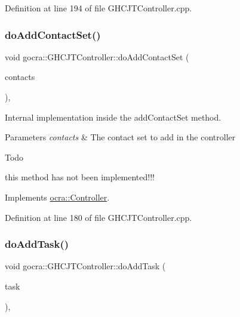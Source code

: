Definition at line 194 of file G\+H\+C\+J\+T\+Controller.\+cpp.

\hypertarget{classgocra_1_1GHCJTController_a28367b3b895eaa223581131258ef5d2d}{}\label{classgocra_1_1GHCJTController_a28367b3b895eaa223581131258ef5d2d} 
\subsubsection{\texorpdfstring{do\+Add\+Contact\+Set()}{doAddContactSet()}}
{\footnotesize\ttfamily void gocra\+::\+G\+H\+C\+J\+T\+Controller\+::do\+Add\+Contact\+Set (\begin{DoxyParamCaption}\item[{const \hyperlink{classocra_1_1ContactSet}{Contact\+Set} \&}]{contacts }\end{DoxyParamCaption})\hspace{0.3cm}{\ttfamily [protected]}, {\ttfamily [virtual]}}

Internal implementation inside the add\+Contact\+Set method.


\begin{DoxyParams}{Parameters}
{\em contacts} & The contact set to add in the controller \\
\hline
\end{DoxyParams}
\begin{DoxyRefDesc}{Todo}
\item[\hyperlink{todo__todo000004}{Todo}]this method has not been implemented!!! \end{DoxyRefDesc}


Implements \hyperlink{classocra_1_1Controller_acb11edc1ceaa89423c1e58f9cb38a9f7}{ocra\+::\+Controller}.



Definition at line 180 of file G\+H\+C\+J\+T\+Controller.\+cpp.

\hypertarget{classgocra_1_1GHCJTController_a9d25d23ba6abca6870e9a435ab3d2993}{}\label{classgocra_1_1GHCJTController_a9d25d23ba6abca6870e9a435ab3d2993} 
\subsubsection{\texorpdfstring{do\+Add\+Task()}{doAddTask()}}
{\footnotesize\ttfamily void gocra\+::\+G\+H\+C\+J\+T\+Controller\+::do\+Add\+Task (\begin{DoxyParamCaption}\item[{\hyperlink{classocra_1_1Task}{Task} \&}]{task }\end{DoxyParamCaption})\hspace{0.3cm}{\ttfamily [protected]}, {\ttfamily [virtual]}}

